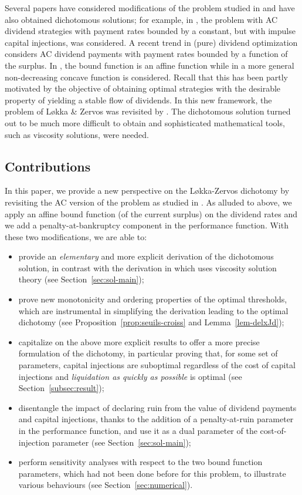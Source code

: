 \documentclass[11pt,reqno]{amsart}
\begin{document}
Several papers have considered modifications of the problem studied in \cite{lokka-zervos_2008} and have also obtained dichotomous solutions; for example, in \cite{Zhu_2017}, the problem with AC dividend strategies with payment rates bounded by a constant, but with impulse capital injections, was considered. A recent trend in (pure) dividend optimization considers AC dividend payments with payment rates bounded by a function of the surplus. In \cite{renaud-simard_2021}, the bound function is an affine function while in \cite{locas-renaud_2024} a more general non-decreasing concave function is considered. Recall that this has been partly motivated by the objective of obtaining optimal strategies with the desirable property of yielding a stable flow of dividends. In this new framework, the problem of L\o kka \& Zervos was revisited by \cite{renaud-et-al_2023}. The dichotomous solution turned out to be much more difficult to obtain and sophisticated mathematical tools, such as viscosity solutions, were needed.

\subsection{Contributions}

In this paper, we provide a new perspective on the L\o kka-Zervos dichotomy by revisiting the AC version of the problem as studied in \cite{renaud-et-al_2023}. As alluded to above, we apply an affine bound function (of the current surplus) on the dividend rates and we add a penalty-at-bankruptcy component in the performance function. With these two modifications, we are able to:
\begin{itemize}
    \item provide an \textit{elementary} and more explicit derivation of the dichotomous solution, in contrast with the derivation in \cite{renaud-et-al_2023} which uses viscosity solution theory (see Section~\ref{sec:sol-main});
    \item prove new monotonicity and ordering properties of the optimal thresholds, which are instrumental in simplifying the derivation leading to the optimal dichotomy (see Proposition~\ref{prop:seuils-croiss} and Lemma~\ref{lem-delxJd});
    \item capitalize on the above more explicit results to offer a more precise formulation of the dichotomy, in particular proving that, for some set of parameters, capital injections are suboptimal regardless of the cost of capital injections and \textit{liquidation as quickly as possible} is optimal (see Section~\ref{subsec:result});
    \item disentangle the impact of declaring ruin from the value of dividend payments and capital injections, thanks to the addition of a penalty-at-ruin parameter in the performance function, and use it as a dual parameter of the cost-of-injection parameter (see Section~\ref{sec:sol-main});
    \item perform sensitivity analyses with respect to the two bound function parameters, which had not been done before for this problem, to illustrate various behaviours (see Section~\ref{sec:numerical}).
\end{itemize}
\end{document}
